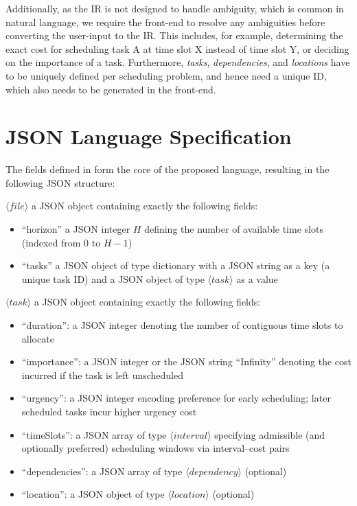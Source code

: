 Additionally, as the \ac{IR} is not designed to handle ambiguity, which is common in natural language, we require the front-end to resolve any ambiguities before converting the user-input to the \ac{IR}. This includes, for example, determining the exact cost for scheduling task A at time slot X instead of time slot Y, or deciding on the importance of a task. Furthermore, \emph{tasks}, \emph{dependencies}, and \emph{locations} have to be uniquely defined per scheduling problem, and hence need a unique ID, which also needs to be generated in the front-end.

\section{JSON Language Specification}
The fields defined in  form the core of the proposed language, resulting in the following \ac{JSON} structure:

$\langle\mathrm{\textit{file}}\rangle$ a JSON object containing exactly the following fields:
\begin{itemize}
    \item ``horizon'' a JSON integer $H$ defining the number of available time slots (indexed from $0$ to $H-1$)
    \item ``tasks'' a JSON object of type dictionary with a JSON string as a key (a unique task ID) and a JSON object of type $\langle\mathrm{\textit{task}}\rangle$ as a value
\end{itemize}

$\langle\mathrm{\textit{task}}\rangle$ a JSON object containing exactly the following fields:
\begin{itemize}
    \item ``duration'': a JSON integer denoting the number of contiguous time slots to allocate
    \item ``importance'': a JSON integer or the JSON string ``Infinity'' denoting the cost incurred if the task is left unscheduled
    \item ``urgency'': a JSON integer encoding preference for early scheduling; later scheduled tasks incur higher urgency cost
    \item ``timeSlots'': a JSON array of type $\langle\mathrm{\textit{interval}}\rangle$ specifying admissible (and optionally preferred) scheduling windows via interval--cost pairs
    \item ``dependencies'': a JSON array of type $\langle\mathrm{\textit{dependency}}\rangle$ (optional)
    \item ``location'': a JSON object of type $\langle\mathrm{\textit{location}}\rangle$ (optional)
\end{itemize}

